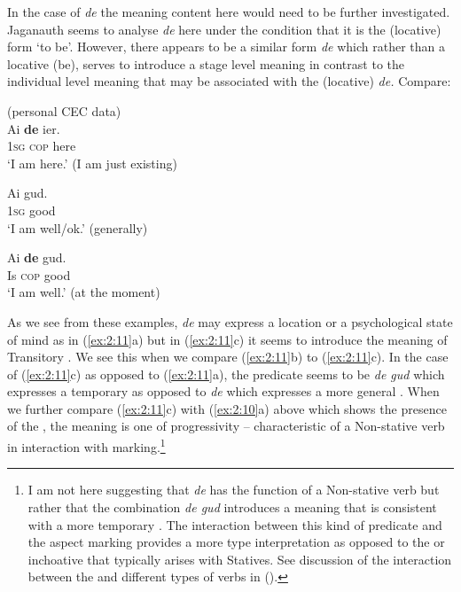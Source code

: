 In the case of \textit{de} the meaning content here would need to be
further investigated.  Jaganauth seems to analyse \textit{de} here
under the condition that it is the  (locative) form `to be'.
However, there appears to be a similar form \textit{de} which rather
than a locative (be), serves to introduce a stage level meaning in
contrast to the individual level meaning that may be associated with
the  (locative) \textit{de.} Compare:

\ea%
\label{ex:2:11}
(personal CEC data)\\

\ea
  \gll  Ai   \textbf{de} ier.\\
\textsc{1sg} \textsc{cop} here\\
\glt `I am here.' (I am just existing)

    \ex  Ai  gud.\\
\textsc{1sg}  good\\
\glt `I am well/ok.' (generally)

\ex
\gll  Ai \textbf{de} gud.\\
      Is \textsc{cop} good\\
\glt `I am well.' (at the moment)
\z \z

As we see from these examples, \textit{de} may express a location or a
psychological state of mind as in (\ref{ex:2:11}a) but in
(\ref{ex:2:11}c) it seems to introduce the meaning of Transitory
.  We see this when we compare (\ref{ex:2:11}b) to
(\ref{ex:2:11}c).  In the case of (\ref{ex:2:11}c) as opposed to
(\ref{ex:2:11}a), the predicate seems to be \textit{de gud} which
expresses a temporary  as opposed to \textit{de} which expresses
a more general . When we further compare (\ref{ex:2:11}c) with
(\ref{ex:2:10}a) above which shows the presence of the 
, the meaning is one of progressivity -- characteristic of
a Non-stative verb in interaction with  marking.\footnote{I
  am not here suggesting that \textit{de} has the function of a
  Non-stative verb but rather that the combination \textit{de gud}
  introduces a meaning that is consistent with a more temporary
  . The interaction between this kind of predicate and the
   aspect marking provides a more  type
  interpretation as opposed to the  or inchoative that
  typically arises with Statives. See discussion of the interaction
  between the  and different types of verbs in 
  ().}


